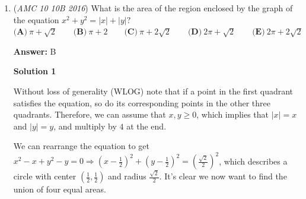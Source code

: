 \begin{enumerate}
 Let \(\mathbf{o}\) be the vector of the origin \(\left(\begin{matrix}0\\ 0\end{matrix}\right)\) and \(\mathbf{o}^{\prime }\) be its image. The displacement vector from the origin to its image is \(\mathbf{o'} - \mathbf{o}\). Using the properties of dilation: \(\mathbf{o}^{\prime }-\mathbf{c}=k(\mathbf{o}-\mathbf{c})\). Subtract \(\mathbf{o} - \mathbf{c}\) from both sides to find the displacement \(\mathbf{o'} - \mathbf{o}\):\(\mathbf{o}^{\prime }-\mathbf{o}=(k-1)(\mathbf{o}-\mathbf{c})\). Substitute known values: 

 
 \[\mathbf{o'} - \mathbf{o} = \left(\frac{3}{2} - 1\right) \left( \begin{pmatrix} 0 \\ 0 \end{pmatrix} - \begin{pmatrix} -4 \\ -6 \end{pmatrix} \right)=\begin{pmatrix} 2 \\ 3 \end{pmatrix}\]

 


 The distance the origin moves is simply the magnitude of the displacement vector \(\mathbf{o'} - \mathbf{o}\):
 \[\text{Distance}=\|\mathbf{o}^{\prime }-\mathbf{o}\|=\sqrt{2^{2}+3^{2}}=\sqrt{4+9}=\boxed{(C) \sqrt{13}}.\]~ erik54321

 


 


	\item (\textit{AMC 10 10B 2016}) What is the area of the region enclosed by the graph of the equation $x^2+y^2=|x|+|y|?$
$\textbf{(A)}\ \pi+\sqrt{2}\qquad\textbf{(B)}\ \pi+2\qquad\textbf{(C)}\ \pi+2\sqrt{2}\qquad\textbf{(D)}\ 2\pi+\sqrt{2}\qquad\textbf{(E)}\ 2\pi+2\sqrt{2}$

 \textbf{Answer: }B



\textbf{Solution 1}

Without loss of generality (WLOG) note that if a point in the first quadrant satisfies the equation, so do its corresponding points in the other three quadrants. Therefore, we can assume that $x, y \ge 0$, which implies that $|x|=x$ and $|y|=y$, and multiply by $4$ at the end.

 We can rearrange the equation to get $x^2-x+y^2-y=0 \Rightarrow (x-\frac12)^2+(y-\frac12)^2=(\frac{\sqrt2}{2})^2$, which describes a circle with center $(\frac12, \frac12)$ and radius $\frac{\sqrt2}{2}.$ It's clear we now want to find the union of four equal areas.


\end{enumerate}
